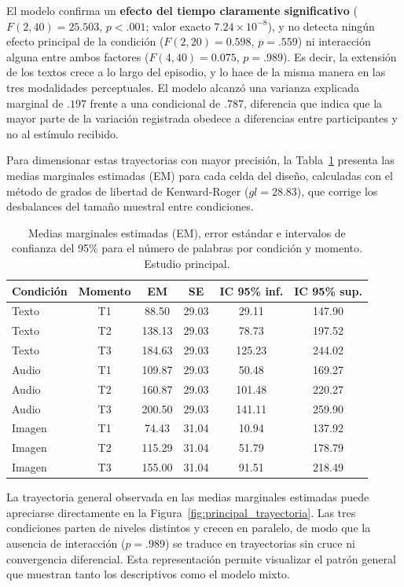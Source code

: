 \documentclass[12pt]{article}
\begin{document}
	El modelo confirma un \textbf{efecto del tiempo claramente significativo} ($F(2,40) = 25.503$, $p < .001$; valor exacto $7.24 \times 10^{-8}$), y no detecta ningún efecto principal de la condición ($F(2,20) = 0.598$, $p = .559$) ni interacción alguna entre	ambos factores ($F(4,40) = 0.075$, $p = .989$). Es decir, la extensión de los textos crece a
	lo largo del episodio, y lo hace de la misma manera en las tres modalidades perceptuales. El modelo alcanzó una varianza explicada marginal de $.197$ frente a una condicional de $.787$, diferencia que indica que la mayor parte de la variación registrada obedece a diferencias entre participantes y no al estímulo recibido.
	
	Para dimensionar estas trayectorias con mayor precisión, la Tabla~\ref{tab:emm_principal} presenta las medias marginales estimadas (EM) para cada celda del diseño, calculadas con el método de grados de libertad de Kenward-Roger ($gl = 28.83$), que corrige los desbalances del tamaño muestral entre condiciones. 
	
	\begin{table}[htbp] 
		\centering 
		\caption{Medias marginales estimadas (EM), error estándar e intervalos de confianza del 95\% para el número de palabras por condición y momento. Estudio principal.} 
		\label{tab:emm_principal} 
		\begin{tabular}{l c c c c c} 
			\toprule 
			Condición & Momento & EM & SE & IC 95\% inf. & IC 95\% sup. \\ 
			\midrule 
			Texto  & T1 &  88.50 & 29.03 &  29.11 & 147.90 \\ 
			Texto  & T2 & 138.13 & 29.03 &  78.73 & 197.52 \\ 
			Texto  & T3 & 184.63 & 29.03 & 125.23 & 244.02 \\ 
			\midrule 
			Audio  & T1 & 109.87 & 29.03 &  50.48 & 169.27 \\ 
			Audio  & T2 & 160.87 & 29.03 & 101.48 & 220.27 \\ 
			Audio  & T3 & 200.50 & 29.03 & 141.11 & 259.90 \\ 
			\midrule 
			Imagen & T1 &  74.43 & 31.04 &  10.94 & 137.92 \\ 
			Imagen & T2 & 115.29 & 31.04 &  51.79 & 178.79 \\ 
			Imagen & T3 & 155.00 & 31.04 &  91.51 & 218.49 \\ 
			\bottomrule 
		\end{tabular} 
	\end{table} 
	
	La trayectoria general observada en las medias marginales estimadas puede apreciarse directamente en la Figura~\ref{fig:principal_trayectoria}. Las tres condiciones parten de niveles distintos y crecen en paralelo, de modo que la ausencia de interacción ($p = .989$) se traduce en trayectorias sin cruce ni convergencia diferencial. Esta representación permite visualizar el patrón general que muestran tanto los descriptivos como el modelo mixto. 
	
\end{document}
